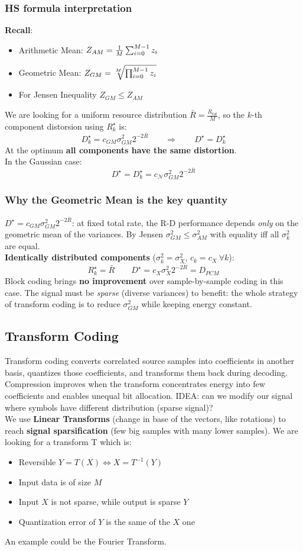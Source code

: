 \subsubsection{HS formula interpretation}
\textbf{Recall}:
\begin{itemize}
    \item Arithmetic Mean: $Z_{AM} = \frac{1}{M}\sr{M-1}{i=0}z_i$
    \item Geometric Mean: $Z_{GM} = \sqrt[M]{\pr{M-1}{i=0}z_i}$
    \item For Jensen Inequality $Z_{GM} \leq Z_{AM}$
\end{itemize}
We are looking for a uniform resource distribution $\bar{R} = \frac{R_{tot}}{M}$, so the $k$-th component distorsion using $R_k^\star$ is:
$$D_k^\star = c_{GM}\sigma^2_{GM}2^{-2\bar{R}} \qquad \Longrightarrow \qquad D^\star = D_k^\star$$
At the optimum \textbf{all components have the same distortion}.\\
In the Gaussian case:
$$D^\star = D_k^\star = c_{\mathcal{N}}\sigma^2_{GM}2^{-2\bar{R}}$$
\subsubsection{Why the Geometric Mean is the key quantity}
$D^\star = c_{GM}\sigma^2_{GM}2^{-2\bar{R}}$: at fixed total rate, the R-D performance depends \emph{only} on the geometric mean of the variances. By Jensen $\sigma^2_{GM} \leq \sigma^2_{AM}$ with equality iff all $\sigma^2_k$ are equal.\\
\textbf{Identically distributed components} ($\sigma^2_k = \sigma^2_X$, $c_k = c_X\ \forall k$):
$$R_k^\star = \bar{R} \qquad D^\star = c_X\sigma^2_X2^{-2\bar{R}} = D_{PCM}$$
Block coding brings \textbf{no improvement} over sample-by-sample coding in this case. The signal must be \emph{sparse} (diverse variances) to benefit: the whole strategy of transform coding is to reduce $\sigma^2_{GM}$ while keeping energy constant.
\subsection{Transform Coding}
Transform coding converts correlated source samples into coefficients in another basis, quantizes those coefficients, and transforms them back during decoding. Compression improves when the transform concentrates energy into few coefficients and enables unequal bit allocation.
IDEA: can we modify our signal where symbols have different distribution (sparse signal)?\\
We use \textbf{Linear Transforms} (change in base of the vectors, like rotations) to reach \textbf{signal sparsification} (few big samples with many lower samples). We are looking for a transform T which is:
\begin{itemize}
    \item Reversible $Y = T(X) \Longleftrightarrow X = T^{-1}(Y)$
    \item Input data is of size $M$
    \item Input $X$ is not sparse, while output is sparse $Y$
    \item Quantization error of $Y$ is the same of the $X$ one
\end{itemize}
An example could be the Fourier Transform.
